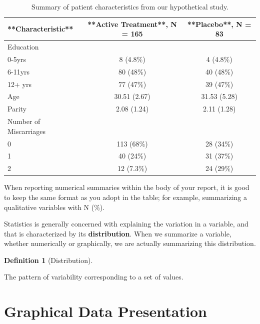 \documentclass[
  letterpaper,
  DIV=11,
  numbers=noendperiod]{scrreprt}
\theoremstyle{definition}
\theoremstyle{definition}
\newtheorem{definition}{Definition}[chapter]
\theoremstyle{remark}
\begin{document}
\hypertarget{tbl-statistical-process-data-summary}{}
\begin{table}
\caption{\label{tbl-statistical-process-data-summary}Summary of patient characteristics from our hypothetical study. }\tabularnewline

\centering
\begin{tabular}{l|c|c}
\hline
**Characteristic** & **Active Treatment**, N = 165 & **Placebo**, N = 83\\
\hline
Education &  & \\
\hline
0-5yrs & 8 (4.8\%) & 4 (4.8\%)\\
\hline
6-11yrs & 80 (48\%) & 40 (48\%)\\
\hline
12+ yrs & 77 (47\%) & 39 (47\%)\\
\hline
Age & 30.51 (2.67) & 31.53 (5.28)\\
\hline
Parity & 2.08 (1.24) & 2.11 (1.28)\\
\hline
Number of Miscarriages &  & \\
\hline
0 & 113 (68\%) & 28 (34\%)\\
\hline
1 & 40 (24\%) & 31 (37\%)\\
\hline
2 & 12 (7.3\%) & 24 (29\%)\\
\hline
\end{tabular}
\end{table}

When reporting numerical summaries within the body of your report, it is
good to keep the same format as you adopt in the table; for example,
summarizing a qualitative variables with N (\%).

Statistics is generally concerned with explaining the variation in a
variable, and that is characterized by its \textbf{distribution}. When
we summarize a variable, whether numerically or graphically, we are
actually summarizing this distribution.

\begin{definition}[Distribution]\protect\hypertarget{def-distribution}{}\label{def-distribution}

The pattern of variability corresponding to a set of values.

\end{definition}

\hypertarget{graphical-data-presentation}{%
\section{Graphical Data
Presentation}\label{graphical-data-presentation}}
\end{document}
